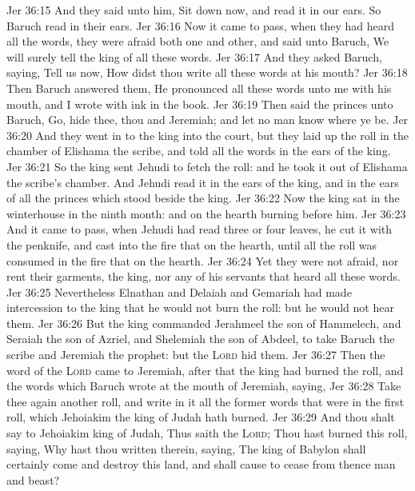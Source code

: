 \vs Jer 36:15 And they said unto him, Sit down now, and read it in our ears. So Baruch read  in their ears.
\vs Jer 36:16 Now it came to pass, when they had heard all the words, they were afraid both one and other, and said unto Baruch, We will surely tell the king of all these words.
\vs Jer 36:17 And they asked Baruch, saying, Tell us now, How didst thou write all these words at his mouth?
\vs Jer 36:18 Then Baruch answered them, He pronounced all these words unto me with his mouth, and I wrote  with ink in the book.
\vs Jer 36:19 Then said the princes unto Baruch, Go, hide thee, thou and Jeremiah; and let no man know where ye be.
\vs Jer 36:20 And they went in to the king into the court, but they laid up the roll in the chamber of Elishama the scribe, and told all the words in the ears of the king.
\vs Jer 36:21 So the king sent Jehudi to fetch the roll: and he took it out of Elishama the scribe's chamber. And Jehudi read it in the ears of the king, and in the ears of all the princes which stood beside the king.
\vs Jer 36:22 Now the king sat in the winterhouse in the ninth month: and  on the hearth burning before him.
\vs Jer 36:23 And it came to pass,  when Jehudi had read three or four leaves, he cut it with the penknife, and cast  into the fire that  on the hearth, until all the roll was consumed in the fire that  on the hearth.
\vs Jer 36:24 Yet they were not afraid, nor rent their garments,  the king, nor any of his servants that heard all these words.
\vs Jer 36:25 Nevertheless Elnathan and Delaiah and Gemariah had made intercession to the king that he would not burn the roll: but he would not hear them.
\vs Jer 36:26 But the king commanded Jerahmeel the son of Hammelech, and Seraiah the son of Azriel, and Shelemiah the son of Abdeel, to take Baruch the scribe and Jeremiah the prophet: but the \textsc{Lord} hid them.
\vs Jer 36:27 Then the word of the \textsc{Lord} came to Jeremiah, after that the king had burned the roll, and the words which Baruch wrote at the mouth of Jeremiah, saying,
\vs Jer 36:28 Take thee again another roll, and write in it all the former words that were in the first roll, which Jehoiakim the king of Judah hath burned.
\vs Jer 36:29 And thou shalt say to Jehoiakim king of Judah, Thus saith the \textsc{Lord}; Thou hast burned this roll, saying, Why hast thou written therein, saying, The king of Babylon shall certainly come and destroy this land, and shall cause to cease from thence man and beast?
